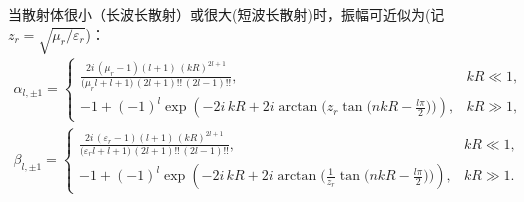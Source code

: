 \begin{exbox}
	当散射体很小（长波长散射）或很大(短波长散射)时，振幅可近似为(记\(z_r=\sqrt{\mu_r/\varepsilon_r}\))：
	\begin{align*}
		\alpha_{l,\pm1}=
		\begin{cases}
			\displaystyle
			\frac{2 i \,(\mu_r-1)(l+1)\,(kR)^{2l+1}}
			{\big(\mu_r l+l+1\big)\,(2l+1)!!\,(2l-1)!!},
			 & kR\ll 1, \\[6pt]
			\displaystyle
			 -1+(-1)^l\exp\!\left(-2 i\,kR+2i\arctan\!\Big(z_r\tan\!\big(nkR-\frac{l\pi}{2}\big)\Big)\right),
			 & kR\gg 1,
		\end{cases}
	\end{align*}
	\begin{align*}
		\beta_{l,\pm1}=
		\begin{cases}
			\displaystyle
			\frac{2 i \,(\varepsilon_r-1)(l+1)\,(kR)^{2l+1}}
			{\big(\varepsilon_r l+l+1\big)\,(2l+1)!!\,(2l-1)!!},
			 & kR\ll 1, \\[6pt]
			\displaystyle
			 -1+(-1)^l\exp\!\left(-2 i\,kR+2i\arctan\!\Big(\frac{1}{z_r}\tan\!\big(nkR-\frac{l\pi}{2}\big)\Big)\right),
			 & kR\gg 1.
		\end{cases}
	\end{align*}
\end{exbox}

